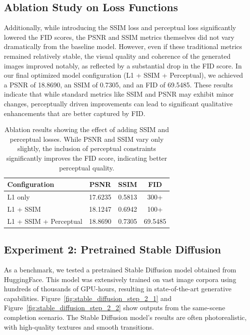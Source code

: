\documentclass[sigconf]{acmart}
\begin{document}
\subsection*{Ablation Study on Loss Functions}

Additionally, while introducing the SSIM loss and perceptual loss significantly lowered the FID scores, the PSNR and SSIM metrics themselves did not vary dramatically from the baseline model. However, even if these traditional metrics remained relatively stable, the visual quality and coherence of the generated images improved notably, as reflected by a substantial drop in the FID score. In our final optimized model configuration (L1 + SSIM + Perceptual), we achieved a PSNR of 18.8690, an SSIM of 0.7305, and an FID of 69.5485. These results indicate that while standard metrics like SSIM and PSNR may exhibit minor changes, perceptually driven improvements can lead to significant qualitative enhancements that are better captured by FID.

\begin{table}[h]
    \centering
    \begin{tabular}{lccc}
        \toprule
        \textbf{Configuration} & \textbf{PSNR} & \textbf{SSIM} & \textbf{FID} \\ 
        \midrule
        L1 only          & 17.6235      & 0.5813      & 300+ \\
        L1 + SSIM         & 18.1247      & 0.6942      & 100+  \\
        L1 + SSIM + Perceptual & 18.8690 & 0.7305 & 69.5485   \\
        \bottomrule
    \end{tabular}
    \caption{Ablation results showing the effect of adding SSIM and perceptual losses. While PSNR and SSIM vary only slightly, the inclusion of perceptual constraints significantly improves the FID score, indicating better perceptual quality.}
    \label{tab:ablation_loss_final}
\end{table}



\subsection*{Experiment 2: Pretrained Stable Diffusion}

As a benchmark, we tested a pretrained Stable Diffusion model \cite{Rombach2022} obtained from HuggingFace. This model was extensively trained on vast image corpora using hundreds of thousands of GPU-hours, resulting in state-of-the-art generative capabilities. Figure~\ref{fig:stable_diffusion_step_2_1} and Figure~\ref{fig:stable_diffusion_step_2_2} show outputs from the same-scene completion scenario. The Stable Diffusion model’s results are often photorealistic, with high-quality textures and smooth transitions. 
\end{document}
